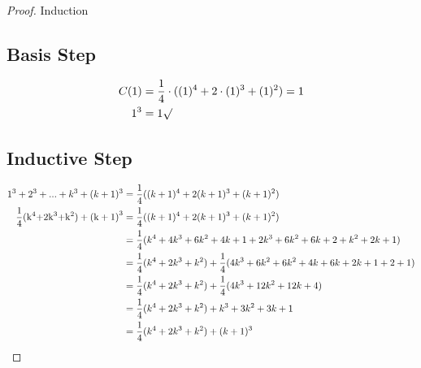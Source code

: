 \begin{problem}{1}\ \\
\begin{proof} Induction \\
\subsection*{Basis Step}
\begin{align*}
{C(1)} &= \frac{1}{4} \cdot ({(1)^4} + 2 \cdot {(1)^3} + {(1)^2}) = 1\\
{1^3} &= 1\surd
\end{align*}
\subsection*{Inductive Step}
\begin{align*}
{1^3} + {2^3} + ... + {k^3} + {(k + 1)^3} &= \frac{1}{4}({(k + 1)^4} + 2{(k + 1)^3} + {(k + 1)^2})\\
\frac{1}{4}{\rm{(}}{{\rm{k}}^4}{\rm{  +  2}}{{\rm{k}}^3}{\rm{  +  }}{{\rm{k}}^2}{\rm{)  +  (k  +  1}}{{\rm{)}}^3} &= \frac{1}{4}({(k + 1)^4} + 2{(k + 1)^3} + {(k + 1)^2})\\
& = \frac{1}{4}({k^4} + 4{k^3} + 6{k^2} + 4k + 1 + 2{k^3} + 6{k^2} + 6k + 2 + {k^2} + 2k + 1)\\
& = \frac{1}{4}({k^4} + 2{k^3} + {k^2}) + \frac{1}{4}(4{k^3} + 6{k^2} + 6{k^2} + 4k + 6k + 2k + 1 + 2 + 1)\\
& = \frac{1}{4}({k^4} + 2{k^3} + {k^2}) + \frac{1}{4}(4{k^3} + 12{k^2} + 12k + 4)\\
& = \frac{1}{4}({k^4} + 2{k^3} + {k^2}) + {k^3} + 3{k^2} + 3k + 1\\
& = \frac{1}{4}({k^4} + 2{k^3} + {k^2}) + {(k + 1)^3}
\end{align*}
\end{proof}
\end{problem}

